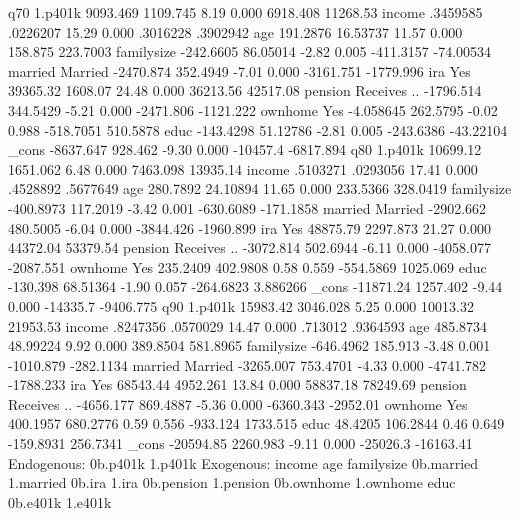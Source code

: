q70          {\VBAR}
     1.p401k {\VBAR}   9093.469   1109.745     8.19   0.000     6918.408    11268.53
      income {\VBAR}   .3459585   .0226207    15.29   0.000     .3016228    .3902942
         age {\VBAR}   191.2876   16.53737    11.57   0.000      158.875    223.7003
  familysize {\VBAR}  -242.6605   86.05014    -2.82   0.005    -411.3157   -74.00534
             {\VBAR}
     married {\VBAR}
    Married  {\VBAR}  -2470.874   352.4949    -7.01   0.000    -3161.751   -1779.996
             {\VBAR}
         ira {\VBAR}
        Yes  {\VBAR}   39365.32    1608.07    24.48   0.000     36213.56    42517.08
             {\VBAR}
     pension {\VBAR}
Receives ..  {\VBAR}  -1796.514   344.5429    -5.21   0.000    -2471.806   -1121.222
             {\VBAR}
     ownhome {\VBAR}
        Yes  {\VBAR}  -4.058645   262.5795    -0.02   0.988    -518.7051    510.5878
        educ {\VBAR}  -143.4298   51.12786    -2.81   0.005    -243.6386   -43.22104
       _cons {\VBAR}  -8637.647    928.462    -9.30   0.000     -10457.4   -6817.894
q80          {\VBAR}
     1.p401k {\VBAR}   10699.12   1651.062     6.48   0.000     7463.098    13935.14
      income {\VBAR}   .5103271   .0293056    17.41   0.000     .4528892    .5677649
         age {\VBAR}   280.7892   24.10894    11.65   0.000     233.5366    328.0419
  familysize {\VBAR}  -400.8973   117.2019    -3.42   0.001    -630.6089   -171.1858
             {\VBAR}
     married {\VBAR}
    Married  {\VBAR}  -2902.662   480.5005    -6.04   0.000    -3844.426   -1960.899
             {\VBAR}
         ira {\VBAR}
        Yes  {\VBAR}   48875.79   2297.873    21.27   0.000     44372.04    53379.54
             {\VBAR}
     pension {\VBAR}
Receives ..  {\VBAR}  -3072.814   502.6944    -6.11   0.000    -4058.077   -2087.551
             {\VBAR}
     ownhome {\VBAR}
        Yes  {\VBAR}   235.2409   402.9808     0.58   0.559    -554.5869    1025.069
        educ {\VBAR}   -130.398   68.51364    -1.90   0.057    -264.6823    3.886266
       _cons {\VBAR}  -11871.24   1257.402    -9.44   0.000     -14335.7   -9406.775
q90          {\VBAR}
     1.p401k {\VBAR}   15983.42   3046.028     5.25   0.000     10013.32    21953.53
      income {\VBAR}   .8247356   .0570029    14.47   0.000      .713012    .9364593
         age {\VBAR}   485.8734   48.99224     9.92   0.000     389.8504    581.8965
  familysize {\VBAR}  -646.4962    185.913    -3.48   0.001    -1010.879   -282.1134
             {\VBAR}
     married {\VBAR}
    Married  {\VBAR}  -3265.007   753.4701    -4.33   0.000    -4741.782   -1788.233
             {\VBAR}
         ira {\VBAR}
        Yes  {\VBAR}   68543.44   4952.261    13.84   0.000     58837.18    78249.69
             {\VBAR}
     pension {\VBAR}
Receives ..  {\VBAR}  -4656.177   869.4887    -5.36   0.000    -6360.343    -2952.01
             {\VBAR}
     ownhome {\VBAR}
        Yes  {\VBAR}   400.1957   680.2776     0.59   0.556     -933.124    1733.515
        educ {\VBAR}    48.4205   106.2844     0.46   0.649    -159.8931    256.7341
       _cons {\VBAR}  -20594.85   2260.983    -9.11   0.000     -25026.3   -16163.41
Endogenous: 0b.p401k 1.p401k
 Exogenous: income age familysize 0b.married 1.married 0b.ira 1.ira
            0b.pension 1.pension 0b.ownhome 1.ownhome educ 0b.e401k 1.e401k
{\smallskip}
